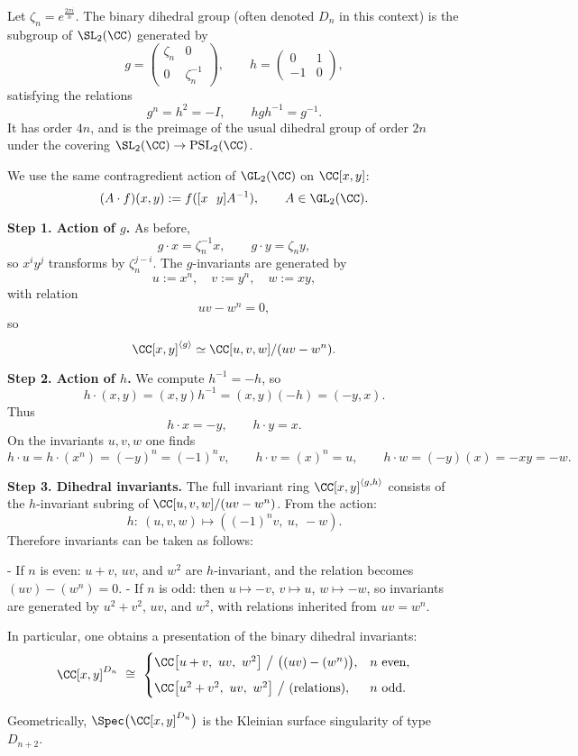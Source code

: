 \documentclass[leqno]{ltjsarticle}
\begin{document}
Let $\zeta_n = e^{\frac{2\pi i}{n}}$.  
The binary dihedral group (often denoted $D_{n}$ in this context) is the subgroup of $\SL_2(\CC)$ generated by
\[
g=\begin{pmatrix}\zeta_n & 0 \\ 0 & \zeta_n^{-1}\end{pmatrix},
\qquad
h=\begin{pmatrix}0 & 1 \\ -1 & 0\end{pmatrix},
\]
satisfying the relations
\[
g^{n} = h^2 = -I, \qquad h g h^{-1} = g^{-1}.
\]
It has order $4n$, and is the preimage of the usual dihedral group of order $2n$ under the covering $\SL_2(\CC)\to\mathrm{PSL}_2(\CC)$.

\medskip

We use the same contragredient action of $\GL_2(\CC)$ on $\CC[x,y]$:
\[
(A\cdot f)(x,y) := f([x\ \ y]A^{-1}),\qquad A\in\GL_2(\CC).
\]

\medskip

\textbf{Step 1. Action of $g$.}  
As before,
\[
g\cdot x = \zeta_n^{-1}x,\qquad g\cdot y=\zeta_n y,
\]
so $x^i y^j$ transforms by $\zeta_n^{j-i}$.  
The $g$-invariants are generated by
\[
u:=x^n,\quad v:=y^n,\quad w:=xy,
\]
with relation
\[
uv-w^n=0,
\]
so
\[
\CC[x,y]^{\langle g\rangle} \simeq \CC[u,v,w]/(uv-w^n).
\]

\medskip

\textbf{Step 2. Action of $h$.}  
We compute $h^{-1}=-h$, so
\[
h\cdot (x,y)=(x,y)h^{-1}=(x,y)(-h)=(-y,x).
\]
Thus
\[
h\cdot x=-y,\qquad h\cdot y=x.
\]
On the invariants $u,v,w$ one finds
\[
h\cdot u = h\cdot (x^n)=(-y)^n = (-1)^n v,\qquad
h\cdot v = (x)^n = u,\qquad
h\cdot w = (-y)(x) = -xy = -w.
\]

\medskip

\textbf{Step 3. Dihedral invariants.}  
The full invariant ring $\CC[x,y]^{\langle g,h\rangle}$ consists of the $h$-invariant subring of $\CC[u,v,w]/(uv-w^n)$.  
From the action:
\[
h:\ (u,v,w)\mapsto((-1)^n v,\ u,\ -w).
\]
Therefore invariants can be taken as follows:

- If $n$ is even: $u+v$, $uv$, and $w^2$ are $h$-invariant, and the relation becomes $(uv)-(w^n)=0$.
- If $n$ is odd: then $u\mapsto -v$, $v\mapsto u$, $w\mapsto -w$, so invariants are generated by $u^2+v^2$, $uv$, and $w^2$, with relations inherited from $uv=w^n$.

\medskip

In particular, one obtains a presentation of the binary dihedral invariants:
\[
\CC[x,y]^{D_n}\ \cong\ 
\begin{cases}
\CC\big[u+v,\ uv,\ w^2\big]\ \big/\ \big((uv)-(w^n)\big), & n\ \text{even},\\[6pt]
\CC\big[u^2+v^2,\ uv,\ w^2\big]\ \big/\ \text{(relations)}, & n\ \text{odd}.
\end{cases}
\]

\medskip

Geometrically, $\Spec\big(\CC[x,y]^{D_n}\big)$ is the Kleinian surface singularity of type $D_{n+2}$.
\end{document}
